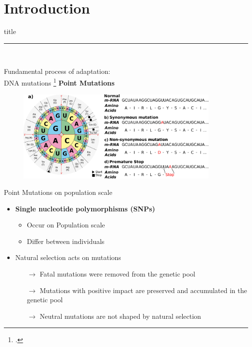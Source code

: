 \documentclass{beamer}
\begin{document}
\section{Introduction}
\begin{frame}[plain]
    \vfill
    \centering
    \begin{beamercolorbox}[sep=8pt,center,shadow=true,rounded=true]{title}
      \insertsectionhead\par%
      \noindent\rule{10cm}{1pt} \\
    \end{beamercolorbox}
    \vfill
\end{frame}
\begin{frame}{Fundamental process of adaptation:\\ DNA mutations \footcite{bresch2013}}
	\textbf{Point Mutations}
	\begin{figure}[tb]
		\centering
		\begin{minipage}[h]{1\textwidth}
		\centering
		\includegraphics[width=0.9\textwidth]{images/Mutations.png}
		\label{fig:Mutations}
		\end{minipage}
	\end{figure}
\end{frame}
\begin{frame}{Point Mutations on population scale}
	\begin{itemize}
		\item \textbf{Single nucleotide polymorphisms (SNPs)}
		\begin{itemize}
			\item Occur on Population scale 
			\item Differ between individuals
		\end{itemize}
		\item Natural selection acts on mutations
		\begin{itemize}
			\item[$\rightarrow$] Fatal mutations were removed from the genetic pool
			\item[$\rightarrow$] Mutations with positive impact are preserved and accumulated in the genetic pool
			\item[$\rightarrow$] Neutral mutations are not shaped by natural selection
		\end{itemize}
	\end{itemize}
\end{frame}	
\end{document}
